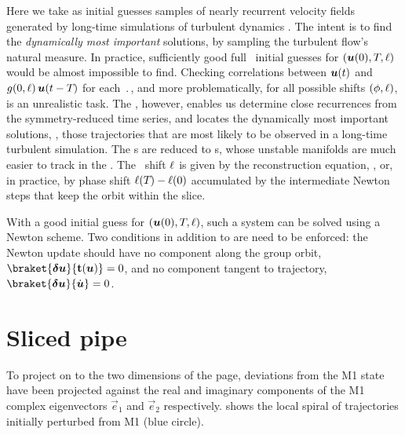 \documentclass{jfm}
\begin{document}
Here we take as initial guesses samples of nearly recurrent velocity
fields generated by long-time simulations of turbulent dynamics
. The intent is to find the {\em dynamically most
important} solutions, by sampling the turbulent flow's natural measure.
In practice, sufficiently good full \statesp\ initial guesses for
$(\mbox{\boldmath $u$}(0),{T_{}},\ell)$ would be almost impossible to find.
Checking correlations between $\mbox{\boldmath $u$}(t)$ and
$g(0,\ell)\,\mbox{\boldmath $u$}(t-{T_{}})$ for each $\period{}$, and
more problematically, for all possible shifts $(\phi,\ell)$, is an
unrealistic task. The \mslices, however, enables us determine close
recurrences  from the symmetry-reduced time series, and locates the
dynamically most important solutions, \ie, those trajectories that are
most likely to be observed in a long-time turbulent simulation. The \rpo
s are reduced to \po s, whose unstable manifolds are much easier to track
in the \reducedsp. The \rpo\ shift $\ell$ is given by the
reconstruction equation, , or, in practice, by phase
shift $\ell({T_{}})-\ell(0)$ accumulated by the intermediate
Newton steps that keep the orbit within the slice.

With a good initial guess for $(\mbox{\boldmath $u$}(0),{T_{}},\ell)$, such a
system can be solved using a Newton scheme.  Two conditions in addition
to  are need to be enforced: the Newton update should have no
component along the group orbit, $\braket{\vec{\delta
u}}{\groupTan(\vec{u})}=0$, and no component tangent to trajectory,
$\braket{\vec{\delta u}}{\dot{\vec{u}}}=0$.

\section{Sliced pipe}
\label{s:slicedWurst}


To project on to the two dimensions of the page,
deviations from the M1 state have been projected against the
real and imaginary components of the M1 complex eigenvectors
$\vec{e}_1$ and $\vec{e}_2$ respectively.
 shows the local spiral of trajectories
initially perturbed from M1 (blue circle).
\end{document}
